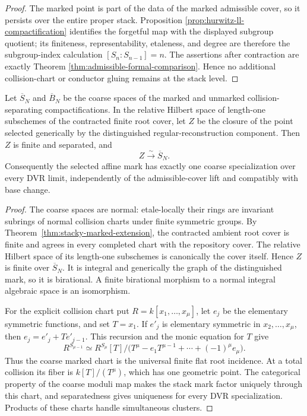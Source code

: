 \begin{proof}
The marked point is part of the data of the marked admissible cover, so it
persists over the entire proper stack.  Proposition
\ref{prop:hurwitz-ll-compactification} identifies the forgetful map with the
displayed subgroup quotient; its finiteness, representability, etaleness,
and degree are therefore the subgroup-index calculation
$[S_n:S_{n-1}]=n$.  The assertions after contraction are exactly Theorem
\ref{thm:admissible-formal-comparison}.  Hence no additional collision-chart
or conductor gluing remains at the stack level.
\end{proof}

\begin{theorem}
\label{thm:coarse-affine-mark-descent}
Let $\overline S_N$ and $\overline B_N$ be the coarse spaces of the marked
and unmarked collision-separating compactifications.  In the relative
Hilbert space of length-one subschemes of the contracted finite root cover,
let $Z$ be the closure of the point selected generically by the distinguished
regular-reconstruction component.  Then $Z$ is finite and separated, and
\[
 Z\xrightarrow{\sim}\overline S_N.
\]
Consequently the selected affine mark has exactly one coarse specialization
over every DVR limit, independently of the admissible-cover lift and
compatibly with base change.
\end{theorem}

\begin{proof}
The coarse spaces are normal: etale-locally their rings are invariant
subrings of normal collision charts under finite symmetric groups.  By
Theorem~\ref{thm:stacky-marked-extension}, the contracted ambient root cover
is finite and agrees in every completed chart with the repository cover.  The
relative Hilbert space of its length-one subschemes is canonically the cover
itself.  Hence $Z$ is finite over $\overline S_N$.  It is integral and
generically the graph of the distinguished mark, so it is birational.  A finite birational
morphism to a normal integral algebraic space is an isomorphism.

For the explicit collision chart put $R=k[x_1,\ldots,x_\mu]$, let
$e_j$ be the elementary symmetric functions, and set $T=x_1$.  If $e'_j$
is elementary symmetric in $x_2,\ldots,x_\mu$, then
$e_j=e'_j+T e'_{j-1}$.  This recursion and the monic equation for $T$ give
\[
 R^{S_{\mu-1}}
 \simeq R^{S_\mu}[T]/
 \bigl(T^\mu-e_1T^{\mu-1}+\cdots+(-1)^\mu e_\mu\bigr).
\]
Thus the coarse marked chart is the universal finite flat root incidence.
At a total collision its fiber is $k[T]/(T^\mu)$, which has one geometric
point.  The categorical property of the coarse moduli map makes the stack
mark factor uniquely through this chart, and separatedness gives uniqueness
for every DVR specialization.  Products of these charts handle simultaneous
clusters.
\end{proof}

